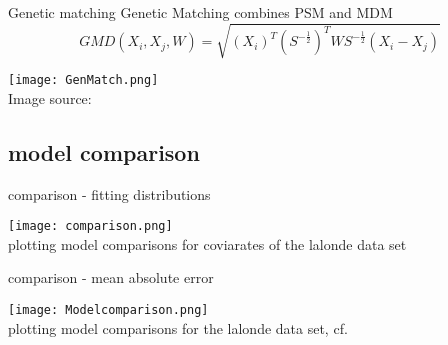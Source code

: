 \documentclass[aspectratio=169]{beamer}
\begin{document}
		\begin{frame}{Genetic matching}
			Genetic Matching combines PSM and MDM
			\begin{equation}
				GMD(X_i, X_j, W) = \sqrt{(X_i)^T(S^{-\frac{1}{2}})^TWS^{-\frac{1}{2}}(X_i-X_j)}
			\end{equation}
			\begin{center}
				\texttt{[image: GenMatch.png]}
					\\\tiny{ Image source: \href{https://humboldt-wi.github.io/blog/research/applied_predictive_modeling_19/matching_methods/}{\underline{}}}
			\end{center}
		\end{frame}

	\subsection{model comparison}
		\begin{frame}{comparison - fitting distributions}
			\begin{center}
				\texttt{[image: comparison.png]}
				\\\tiny{plotting model comparisons for coviarates of the lalonde data set}
			\end{center}
		\end{frame}

		\begin{frame}{comparison - mean absolute error}
			\begin{center}
				\texttt{[image: Modelcomparison.png]}
				\\\tiny{plotting model comparisons for the lalonde data set, cf. \cite{Colson2016}}
			\end{center}
		\end{frame}
\end{document}
